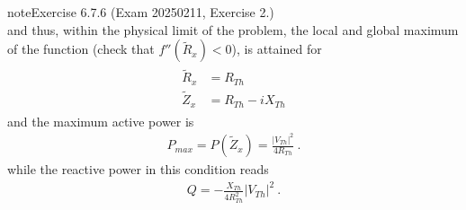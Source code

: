 \documentclass[letterpaper,10pt,english]{jupyterBook}
\begin{document}
\begin{sphinxadmonition}{note}{Exercise 6.7.6 (Exam 2025\sphinxhyphen{}02\sphinxhyphen{}11, Exercise 2.)}
\begin{equation*}
\end{equation*}
\sphinxAtStartPar
and thus, within the physical limit of the problem, the local and global maximum of the function (check that \(f''(\widetilde{R}_x) < 0\)), is attained for
\begin{equation*}
\begin{split}\begin{aligned}
  \widetilde{R}_{x} & = R_{Th} \\
  \widetilde{Z}_{x} & = R_{Th} - i X_{Th}
\end{aligned}\end{split}
\end{equation*}
\sphinxAtStartPar
and the maximum active power is
\begin{equation*}
\begin{split}P_{max} = P(\widetilde{Z}_x) = \frac{|V_{Th}|^2}{4 R_{Th} } \ .\end{split}
\end{equation*}
\sphinxAtStartPar
while the reactive power in this condition reads
\begin{equation*}
\begin{split}Q = - \frac{ X_{Th} }{4 R^2_{Th}} |V_{Th}|^2 \ .\end{split}
\end{equation*}\end{sphinxadmonition}
 \label{exercise:exam-25-02-11-exe-03}
\end{document}
